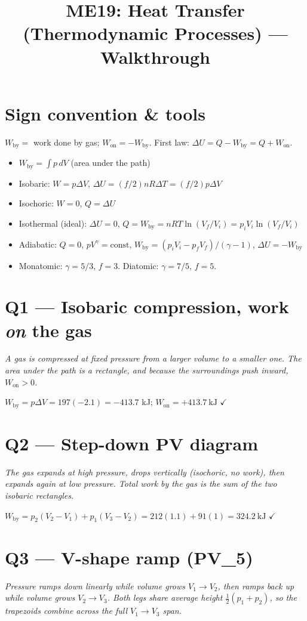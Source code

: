 \documentclass[11pt]{article}
\title{ME19: Heat Transfer (Thermodynamic Processes) --- Walkthrough}
\author{}\date{}
\newcommand{\checkmk}{\ensuremath{\checkmark}}
\begin{document}
\maketitle

\section*{Sign convention \& tools}
$W_{\text{by}} = $ work done by gas; $W_{\text{on}} = -W_{\text{by}}$. First law: $\Delta U = Q - W_{\text{by}} = Q + W_{\text{on}}$.
\begin{itemize}[leftmargin=*]
\item $W_{\text{by}} = \int p\,dV$ (area under the path)
\item Isobaric: $W = p\Delta V$, $\Delta U = (f/2)nR\Delta T = (f/2)p\Delta V$
\item Isochoric: $W=0$, $Q=\Delta U$
\item Isothermal (ideal): $\Delta U=0$, $Q = W_{\text{by}} = nRT\ln(V_f/V_i) = p_iV_i\ln(V_f/V_i)$
\item Adiabatic: $Q=0$, $pV^\gamma=\text{const}$, $W_{\text{by}}=(p_iV_i-p_fV_f)/(\gamma-1)$, $\Delta U=-W_{\text{by}}$
\item Monatomic: $\gamma = 5/3$, $f=3$. Diatomic: $\gamma = 7/5$, $f=5$.
\end{itemize}

\section*{Q1 --- Isobaric compression, work \emph{on} the gas}
\emph{A gas is compressed at fixed pressure from a larger volume to a smaller one. The area under the path is a rectangle, and because the surroundings push inward, $W_{\text{on}} > 0$.}

$W_{\text{by}} = p\Delta V = 197(-2.1) = -413.7$ kJ; $W_{\text{on}} = \boxed{+413.7\ \text{kJ}}$ \checkmk

\section*{Q2 --- Step-down PV diagram}
\emph{The gas expands at high pressure, drops vertically (isochoric, no work), then expands again at low pressure. Total work by the gas is the sum of the two isobaric rectangles.}

$W_{\text{by}} = p_2(V_2-V_1) + p_1(V_3-V_2) = 212(1.1) + 91(1) = \boxed{324.2\ \text{kJ}}$ \checkmk

\section*{Q3 --- V-shape ramp (PV\_5)}
\emph{Pressure ramps down linearly while volume grows $V_1 \to V_2$, then ramps back up while volume grows $V_2 \to V_3$. Both legs share average height $\tfrac12(p_1+p_2)$, so the trapezoids combine across the full $V_1 \to V_3$ span.}
\end{document}
